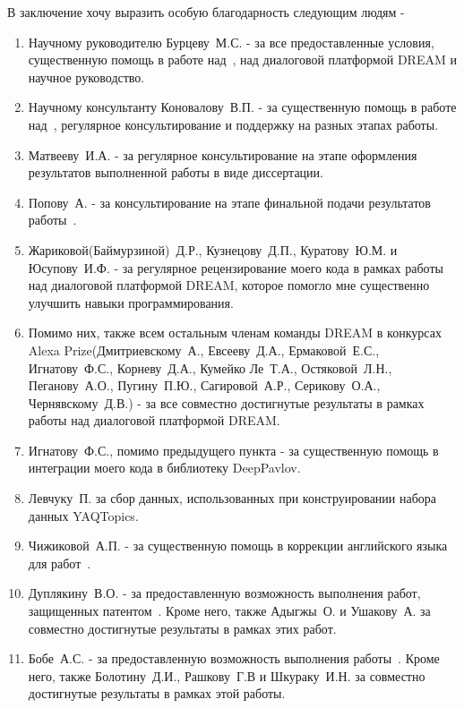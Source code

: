 В заключение хочу выразить особую благодарность следующим людям - 
\begin{enumerate}
\item Научному руководителю Бурцеву~М.\:С. - за все предоставленные условия, существенную помощь в работе над~\cite{dream1,dream1_trudy,dream2,pseudolabel,mtldream}, над диалоговой платформой DREAM и научное руководство.
\item Научному консультанту Коновалову~В.\:П. - за существенную помощь в работе над~\cite{rumtl,rutopics}, регулярное консультирование и поддержку на разных этапах работы.
\item Матвееву~И.\:А. - за регулярное консультирование на этапе оформления результатов выполненной работы в виде диссертации.
\item Попову~А. - за консультирование на этапе финальной подачи результатов работы~\cite{rutopics}.
\item Жариковой(Баймурзиной)~Д.\:Р., Кузнецову~Д.\:П., Куратову~Ю.\:М. и Юсупову~И.\:Ф. - за регулярное рецензирование моего кода в рамках работы над диалоговой платформой DREAM, которое помогло мне существенно улучшить навыки программирования. 
\item Помимо них, также всем остальным членам команды DREAM в конкурсах Alexa Prize(Дмитриевскому~А., Евсееву~Д.\:А., Ермаковой~Е.\:С., Игнатову~Ф.\:С., Корневу~Д.\:А., Кумейко Ле~Т.\:А., Остяковой~Л.\:Н., Пеганову~А.\:О., Пугину~П.\:Ю., Сагировой~А.\:Р., Серикову~О.\:А., Чернявскому~Д.\:В.) - за все совместно достигнутые результаты в рамках работы над диалоговой платформой DREAM. 
\item Игнатову~Ф.\:С., помимо предыдущего пункта - за существенную помощь в интеграции моего кода в библиотеку DeepPavlov.
\item Левчуку~П. за сбор данных, использованных при конструировании набора данных YAQTopics.
\item Чижиковой~А.\:П. - за существенную помощь в коррекции английского языка для работ~\cite{rumtl,rutopics}.
\item Дуплякину~В.\:О. - за предоставленную возможность выполнения работ, защищенных патентом~\cite{Дуплякин_Дмитрий_Ондар_Ушаков_2021}. Кроме него, также Адыгжы~\:О. и Ушакову~\:А. за совместно достигнутые результаты в рамках этих работ. 
\item Бобе~А.\:С. - за предоставленную возможность выполнения работы~\cite{Болотин_Карпов_Рашков_Шкурак_2019}. Кроме него, также Болотину~Д.\:И., Рашкову~Г.\:В и Шкураку~И.\:Н. за совместно достигнутые результаты в рамках этой работы. 

\end{enumerate}
